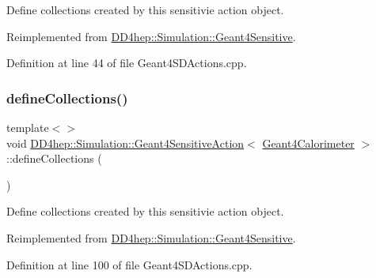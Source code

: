 Define collections created by this sensitivie action object. 



Reimplemented from \hyperlink{class_d_d4hep_1_1_simulation_1_1_geant4_sensitive_a88c872b79e49e399c8ee282960c2d77d}{D\+D4hep\+::\+Simulation\+::\+Geant4\+Sensitive}.



Definition at line 44 of file Geant4\+S\+D\+Actions.\+cpp.

\hypertarget{class_d_d4hep_1_1_simulation_1_1_geant4_sensitive_action_a87ec394277c9edd3eb91233c96d67d5e}{}\label{class_d_d4hep_1_1_simulation_1_1_geant4_sensitive_action_a87ec394277c9edd3eb91233c96d67d5e} 
\subsubsection{\texorpdfstring{define\+Collections()}{defineCollections()}\hspace{0.1cm}{\footnotesize\ttfamily [2/7]}}
{\footnotesize\ttfamily template$<$$>$ \\
void \hyperlink{class_d_d4hep_1_1_simulation_1_1_geant4_sensitive_action}{D\+D4hep\+::\+Simulation\+::\+Geant4\+Sensitive\+Action}$<$ \hyperlink{class_d_d4hep_1_1_simulation_1_1_geant4_calorimeter}{Geant4\+Calorimeter} $>$\+::define\+Collections (\begin{DoxyParamCaption}{ }\end{DoxyParamCaption})\hspace{0.3cm}{\ttfamily [virtual]}}



Define collections created by this sensitivie action object. 



Reimplemented from \hyperlink{class_d_d4hep_1_1_simulation_1_1_geant4_sensitive_a88c872b79e49e399c8ee282960c2d77d}{D\+D4hep\+::\+Simulation\+::\+Geant4\+Sensitive}.



Definition at line 100 of file Geant4\+S\+D\+Actions.\+cpp.

\hypertarget{class_d_d4hep_1_1_simulation_1_1_geant4_sensitive_action_abf6d5d9073398944a94a773e06df9594}{}\label{class_d_d4hep_1_1_simulation_1_1_geant4_sensitive_action_abf6d5d9073398944a94a773e06df9594} 
